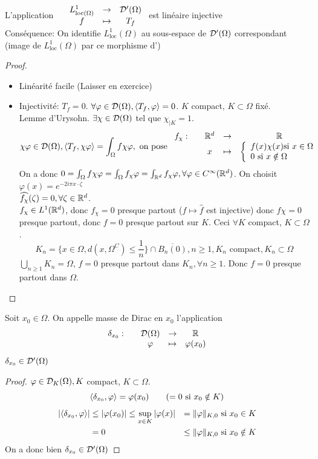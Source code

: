 \documentclass[]{report}
\begin{document}
    \begin{prop}{}{}
        L'application $\begin{array}{ccccc} & L^1_{\text{loc}(\Omega)} & \to & \mathcal{D}'(\Omega) \\ & f & \mapsto & T_f \end{array}$ est linéaire injective\\
        Conséquence: On identifie $L^1_{\text{loc}}(\Omega)$ au sous-espace de $\mathcal{D}'(\Omega)$ correspondant (image de $L^1_{\text{loc}}(\Omega)$ par ce morphisme d'\ev)
    \end{prop}

    \begin{proof}
        \begin{itemize}
            \item Linéarité facile (Laisser en exercice)
            \item Injectivité: $T_f=0$. $\forall \varphi\in \mathcal{D}(\Omega),\langle T_f,\varphi \rangle=0$. $K$ compact, $K\subset \Omega$ fixé.\\
            Lemme d'Urysohn. $\exists \chi \in \mathcal{D}(\Omega)$ tel que $\chi_{|K}=1$.
            \[\chi \varphi \in \mathcal{D}(\Omega), \langle T_f,\chi \varphi \rangle=\int_{\Omega}f\chi \varphi,\text{ on pose }\begin{array}{ccccc} f_\chi : & & \mathbb{R}^d & \to & \mathbb{R} \\ & & x & \mapsto & \left\{\begin{array}{ll} f(x)\chi(x)\text{si $x\in \Omega$}\\ 0\text{ si $x\notin \Omega$} \end{array} \right. \end{array}\]
            On a donc $0=\int_{\Omega}f\chi \varphi=\int_{\Omega}f_\chi \varphi=\int_{\mathbb{R}^d}f_\chi \varphi,\forall \varphi\in C^\infty(\mathbb{R}^d)$. On choisit $\varphi(x)=e^{-2i\pi x\cdot \zeta}$\\
            $\widehat{f_\chi}(\zeta)=0,\forall \zeta\in \mathbb{R}^d$.\\
            $f_\chi\in L^1(\mathbb{R}^d)$, donc $f_\chi=0$ presque partout ($f\mapsto \widehat{f}$ est injective) donc $f\chi=0$ presque partout, donc $f=0$ presque partout sur $K$. Ceci $\forall K$ compact, $K\subset \Omega$.
            \[K_n=\{x\in \Omega,d(x,\Omega^C)\le \frac{1}{n}\}\cap \overline{B_n(0)}, n\ge 1, K_n\text{ compact}, K_n\subset \Omega\]
            $\bigcup_{n\ge 1}K_n=\Omega$, $f=0$ presque partout dans $K_n,\forall n \ge 1$. Donc $f=0$ presque partout dans $\Omega$.
        \end{itemize}
    \end{proof}

    \begin{df}{}{}
        Soit $x_0\in\Omega$. On appelle masse de Dirac en $x_0$ l'application 
        \[\begin{array}{ccccc} \delta_{x_0} : & & \mathcal{D}(\Omega) & \to & \mathbb{R} \\ & & \varphi & \mapsto & \varphi(x_0) \end{array}\]
        $\delta_{x_0}\in \mathcal{D}'(\Omega)$
    \end{df}

    \begin{proof}
        $\varphi\in \mathcal{D}_K(\Omega),K$ compact, $K\subset \Omega$.
        \[\langle \delta_{x_0},\varphi \rangle=\varphi(x_0) \qquad(=0\text{ si $x_0\notin K$})\]
        \begin{align*}
            \left|\langle \delta_{x_0},\varphi \rangle\right|&\le \left|\varphi(x_0)\right|\le \sup_{x\in K}\left|\varphi(x)\right|&=\lVert \varphi \rVert_{K,0}&\text{ si $x_0\in K$}\\
            &=0&\le \lVert \varphi \rVert_{K,0}&\text{ si $x_0\notin K$}
        \end{align*}
        On a donc bien $\delta_{x_0}\in \mathcal{D}'(\Omega)$
    \end{proof}
\end{document}
